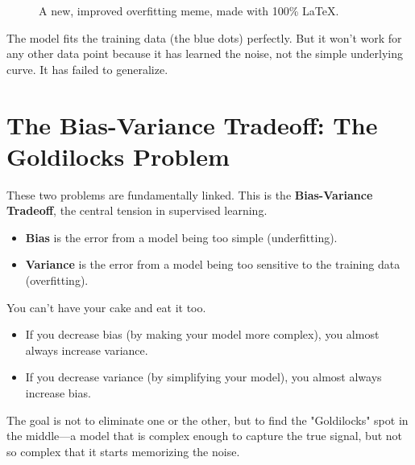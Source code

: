 \documentclass[11pt, letterpaper, openany]{book}
\begin{document}
\begin{figure}[h!]
    \centering
    \caption{A new, improved overfitting meme, made with 100\% LaTeX.}
\end{figure}

The model fits the training data (the blue dots) perfectly. But it won't work for any other data point because it has learned the noise, not the simple underlying curve. It has failed to generalize.

\section{The Bias-Variance Tradeoff: The Goldilocks Problem}

These two problems are fundamentally linked. This is the \textbf{Bias-Variance Tradeoff}, the central tension in supervised learning.
\begin{itemize}
    \item \textbf{Bias} is the error from a model being too simple (underfitting).
    \item \textbf{Variance} is the error from a model being too sensitive to the training data (overfitting).
\end{itemize}
You can't have your cake and eat it too.
\begin{itemize}
    \item If you decrease bias (by making your model more complex), you almost always increase variance.
    \item If you decrease variance (by simplifying your model), you almost always increase bias.
\end{itemize}
The goal is not to eliminate one or the other, but to find the "Goldilocks" spot in the middle—a model that is complex enough to capture the true signal, but not so complex that it starts memorizing the noise.
\end{document}
